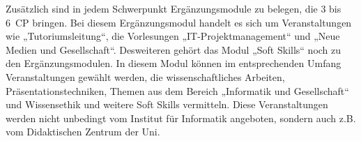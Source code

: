 Zusätzlich sind in jedem Schwerpunkt Ergänzungsmodule zu belegen, die 3 bis 6~CP bringen. Bei diesem Ergänzungsmodul handelt es sich um Veranstaltungen wie „Tutoriumsleitung“, die Vorlesungen „IT-Projektmanagement“ und „Neue Medien und Gesellschaft“. Desweiteren gehört das Modul „Soft Skills“ noch zu den Ergänzungsmodulen. In diesem Modul können im entsprechenden Umfang Veranstaltungen gewählt werden, die wissenschaftliches Arbeiten, Präsentationstechniken, Themen aus dem Bereich „Informatik und Gesellschaft“ und Wissensethik und weitere Soft Skills vermitteln. Diese Veranstaltungen werden nicht unbedingt vom Institut für Informatik angeboten, sondern auch z.B. vom Didaktischen Zentrum der Uni. 
\spaltenende
